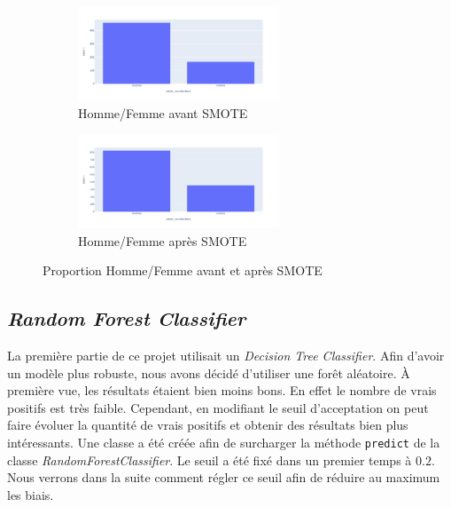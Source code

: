 \documentclass{article}
\begin{document}
    \vspace{1cm}
    \begin{figure}[h]
        \centering
        \begin{subfigure}{6cm}
            \includegraphics[width=6cm]{./img/smote/sex_before.png}
            \caption{Homme/Femme avant SMOTE}\label{fig:before_smote_sex}
        \end{subfigure}
        \vspace{\floatsep}
        \hspace{0.4cm}
        \begin{subfigure}{6cm}
            \includegraphics[width=6cm]{./img/smote/sex_after.png}
        \caption{Homme/Femme après SMOTE}\label{fig:after_smote_sex}
        \end{subfigure}
        \caption{Proportion Homme/Femme avant et après SMOTE}\label{fig:smote2}
    \end{figure}
    \vspace{1cm}

    \subsection{\textit{Random Forest Classifier}}
    La première partie de ce projet utilisait un \textit{Decision Tree Classifier}.
    Afin d'avoir un modèle plus robuste, nous avons décidé d'utiliser une forêt aléatoire.
    À première vue, les résultats étaient bien moins bons. En effet le nombre de 
    vrais positifs est très faible. Cependant, en modifiant le seuil d'acceptation on 
    peut faire évoluer la quantité de vrais positifs et obtenir des résultats bien plus 
    intéressants. Une classe a été créée afin de surcharger la méthode \verb|predict| de 
    la classe \textit{RandomForestClassifier}. Le seuil a été fixé dans un premier temps à 
    $0.2$. Nous verrons dans la suite comment régler ce seuil afin de réduire au maximum les 
    biais.
\end{document}
